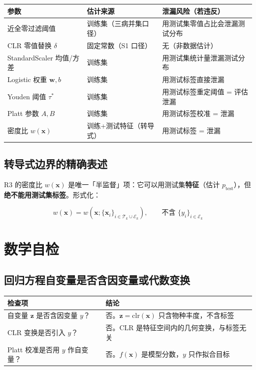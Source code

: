 \documentclass{internal-report}
\begin{document}
\begin{center}
\begin{tabular}{lll}
\toprule
参数 & 估计来源 & 泄漏风险（若违反） \\
\midrule
近全零过滤阈值 & 训练集（三病并集口径） & 用测试集零值占比会泄漏测试分布 \\
CLR 零值替换 $\delta$ & 固定常数（S1 口径） & 无（非数据估计） \\
StandardScaler 均值/方差 & 训练集 & 用测试集统计量泄漏测试分布 \\
Logistic 权重 $\mathbf{w},b$ & 训练集 & 用测试标签直接泄漏 \\
Youden 阈值 $\tau^{*}$ & 训练集 & 用测试标签重定阈值 = 评估泄漏 \\
Platt 参数 $A,B$ & 训练集 & 用测试标签校准 = 泄漏 \\
密度比 $w(\mathbf{x})$ & 训练+测试特征（转导式） & 用测试标签 = 泄漏 \\
\bottomrule
\end{tabular}
\end{center}

\subsection{转导式边界的精确表述}

R3 的密度比 $w(\mathbf{x})$ 是唯一「半监督」项：它可以用测试集\textbf{特征}（估计 $p_{\text{test}}$），但\textbf{绝不能用测试集标签}。形式化：

$$
w(\mathbf{x}) = w\!\left(\mathbf{x}; \{\mathbf{x}_i\}_{i\in\mathcal{T}_k\cup\mathcal{E}_k}\right), \qquad \text{不含 } \{y_i\}_{i\in\mathcal{E}_k}
$$

\section{数学自检}

\subsection{回归方程自变量是否含因变量或代数变换}

\begin{center}
\begin{tabular}{ll}
\toprule
检查项 & 结论 \\
\midrule
自变量 $\mathbf{z}$ 是否含因变量 $y$？ & 否。$\mathbf{z}=\text{clr}(\mathbf{x})$ 只含物种丰度，不含标签 \\
CLR 变换是否引入 $y$？ & 否。CLR 是特征空间内的几何变换，与标签无关 \\
Platt 校准是否用 $y$ 作自变量？ & 否。$f(\mathbf{x})$ 是模型分数，$y$ 只作拟合目标 \\
\bottomrule
\end{tabular}
\end{center}
\end{document}
